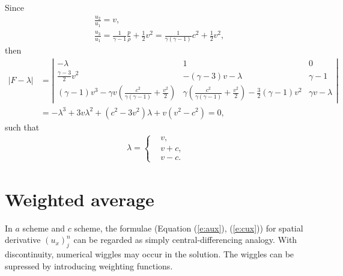 \documentclass[11pt,dvips]{article}
\numberwithin{equation}{section}
\begin{document}
Since
\begin{align*}
  & \frac{u_2}{u_1} = v, \\
  & \frac{u_3}{u_1} = \frac{1}{\gamma-1}\frac{p}{\rho} + \frac{1}{2}v^2
    = \frac{1}{\gamma(\gamma-1)}c^2 + \frac{1}{2}v^2,
\end{align*}
then
\begin{align*}
  |F-\lambda| &=
    \left|\begin{array}{ccc}
      -\lambda & 1 & 0 \\
      \frac{\gamma-3}{2}v^2 &
      -(\gamma-3)v - \lambda &
      \gamma-1 \\
      (\gamma-1)v^3
        - \gamma v(\frac{c^2}{\gamma(\gamma-1)}+\frac{v^2}{2}) &
      \gamma(\frac{c^2}{\gamma(\gamma-1)}+\frac{v^2}{2})
        - \frac{3}{2}(\gamma-1)v^2 &
      \gamma v - \lambda
    \end{array}\right| \\
  &= -\lambda^3 + 3v\lambda^2 + (c^2-3v^2)\lambda + v(v^2-c^2)
   = 0,
\end{align*}
such that
\begin{align}
  \lambda =
  \left\{\begin{aligned}
    &v   , \\
    &v+c , \\
    &v-c .
  \end{aligned}\right. \label{e:euler_eigenvalue}
\end{align}

\section{Weighted average}
\label{s:weighted_average}

In $a$ scheme and $c$ scheme, the formulae (Equation (\ref{e:aux}),
(\ref{e:cux})) for spatial derivative $(u_x)_j^n$ can be regarded as simply
central-differencing analogy\cite{chang_method_1995,
chang_multi-dimensional_2003}.  With discontinuity, numerical wiggles may occur
in the solution\cite{chang_multi-dimensional_2003}.  The wiggles can be
supressed by introducing weighting functions\cite{chang_method_1995,
chang_multi-dimensional_2003}.
\end{document}

